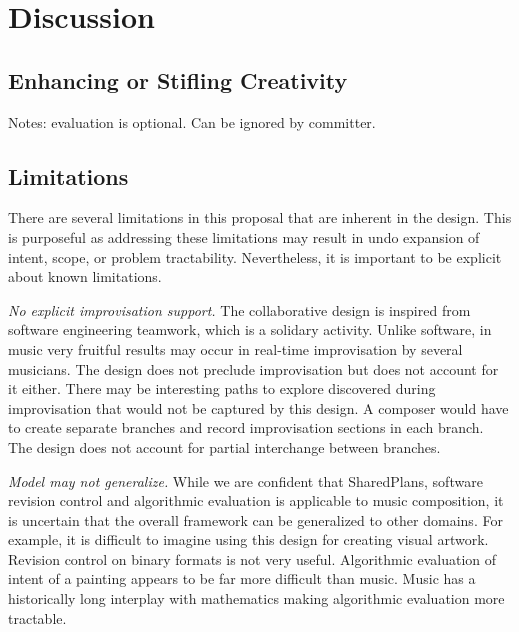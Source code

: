 \documentclass[final,authoryear,5p,times,twocolumn]{elsarticle}
\begin{document}



\section{Discussion}

\subsection{Enhancing or Stifling Creativity}

Notes: evaluation is optional. Can be ignored by committer.

\subsection{Limitations}

There are several limitations in this proposal that are inherent in the design. This is purposeful as addressing these limitations may result in undo expansion of intent, scope, or problem tractability. Nevertheless, it is important to be explicit about known limitations.

\textit{No explicit improvisation support.} The collaborative design is inspired from software engineering teamwork, which is a solidary activity. Unlike software, in music very fruitful results may occur in real-time improvisation by several musicians. The design does not preclude improvisation but does not account for it either. There may be interesting paths to explore discovered during improvisation that would not be captured by this design. A composer would have to create separate branches and record improvisation sections in each branch. The design does not account for partial interchange between branches.

\textit{Model may not generalize.} While we are confident that SharedPlans, software revision control and algorithmic evaluation is applicable to music composition, it is uncertain that the overall framework can be generalized to other domains. For example, it is difficult to imagine using this design for creating visual artwork. Revision control on binary formats is not very useful. Algorithmic evaluation of intent of a painting appears to be far more difficult than music. Music has a historically long interplay with mathematics making algorithmic evaluation more tractable. 
\end{document}
